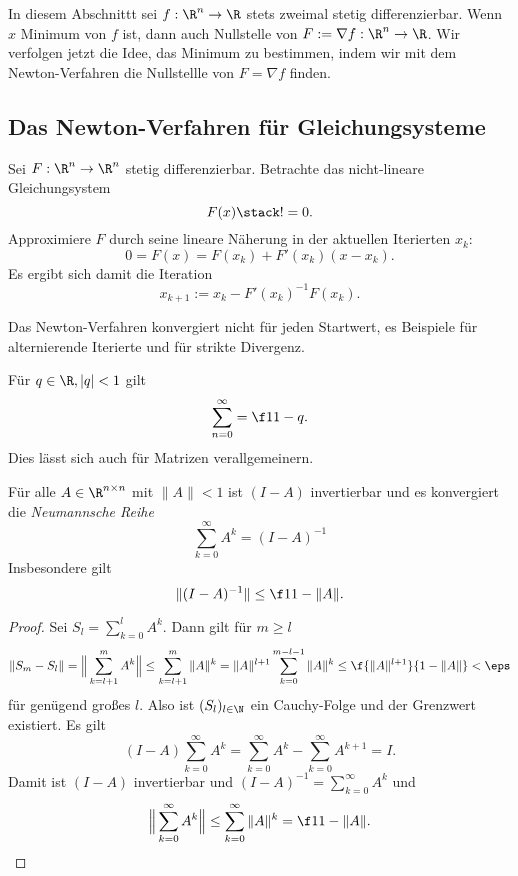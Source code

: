 In diesem Abschnittt sei $f: \R^n \to \R$ stets zweimal stetig differenzierbar.
Wenn $\hat x$ Minimum von $f$ ist, dann auch Nullstelle von $F := \nabla f : \R^n \to \R$.
Wir verfolgen jetzt die Idee, das Minimum zu bestimmen, indem wir mit dem Newton-Verfahren die Nullstellle von $F = \nabla f$ finden.

\subsection{Das Newton-Verfahren für Gleichungsysteme}

Sei $F: \R^n \to \R^n$ stetig differenzierbar.
Betrachte das nicht-lineare Gleichungsystem
\[
	F(x) \stack != 0.
\]
Approximiere $F$ durch seine lineare Näherung in der aktuellen Iterierten $x_k$:
\[
	0
	= F(x)
	= F(x_k) + F'(x_k)(x-x_k).
\]
Es ergibt sich damit die Iteration
\[
	x_{k+1}
	:= x_k - F'(x_k)^{-1} F(x_k).
\]

\begin{alg} \label{alg:5}
	\begin{algorithmic}
		\EndWhile
	\end{algorithmic}
\end{alg}

Das Newton-Verfahren konvergiert nicht für jeden Startwert, es Beispiele für alternierende Iterierte und für strikte Divergenz.

Für $q \in \R, |q| < 1$ gilt
\[
	\sum_{n=0}^\infty = \f 1{1-q}.
\]
Dies lässt sich auch für Matrizen verallgemeinern.

\begin{lem} \label{2.40}
	Für alle $A \in \R^{n\times n}$ mit $\|A\| < 1$ ist $(I-A)$ invertierbar und es konvergiert die \emph{Neumannsche Reihe}
	\[
		\sum_{k=0}^\infty A^k
		= (I-A)^{-1}
	\]
	Insbesondere gilt
	\[
		\|(I-A)^{-1}\|
		\le \f 1{1-\|A\|}.
	\]
	\begin{proof}
		Sei $S_l = \sum_{k=0}^l A^k$.
		Dann gilt für $m \ge l$
		\[
			\|S_m - S_l\|
			= \Big\| \sum_{k=l+1}^m A^k \Big\|
			\le \sum_{k=l+1}^m \|A\|^k
			= \|A\|^{l+1} \sum_{k=0}^{m-l-1} \|A\|^k
			\le \f{\|A\|^{l+1}}{1-\|A\|}
			< \eps
		\]
		für genügend großes $l$.
		Also ist $(S_l)_{l\in\N}$ ein Cauchy-Folge und der Grenzwert existiert.
		Es gilt
		\[
			(I-A) \sum_{k=0}^\infty A^k
			= \sum_{k=0}^\infty A^k - \sum_{k=0}^\infty A^{k+1}
			= I.
		\]
		Damit ist $(I-A)$ invertierbar und $(I-A)^{-1} = \sum_{k=0}^\infty A^k$ und
		\[
			\Big\| \sum_{k=0}^\infty A^k \Big\|
			\le \sum_{k=0}^\infty \|A\|^k
			= \f 1{1-\|A\|}.
		\]
	\end{proof}
\end{lem}

